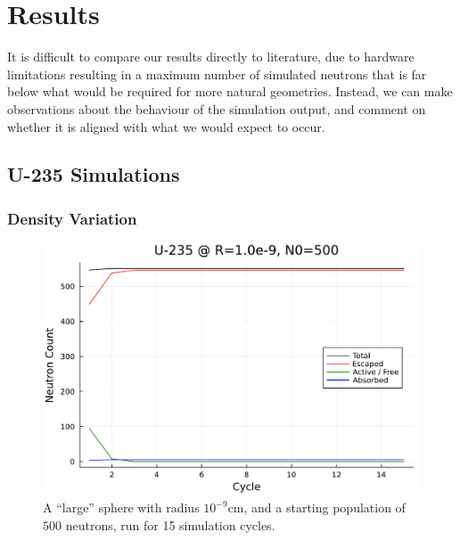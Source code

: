 \section{Results}

It is difficult to compare our results directly to literature, due to hardware limitations resulting in a maximum number of 
simulated neutrons that is far below what would be required for more natural geometries. Instead, we can make observations 
about the behaviour of the simulation output, and comment on whether it is aligned with what we would expect to occur.

\subsection{U-235 Simulations}

\subsubsection{Density Variation}

\begin{figure}[h!]
    \centering
    \includegraphics[scale=0.7]{imgs/neutron-count-uranium-large-sphere.pdf}
    \caption{A ``large'' sphere with radius $10^{-9}$cm, and a starting population of $500$ neutrons, run for 15 simulation 
    cycles.}
\end{figure}

